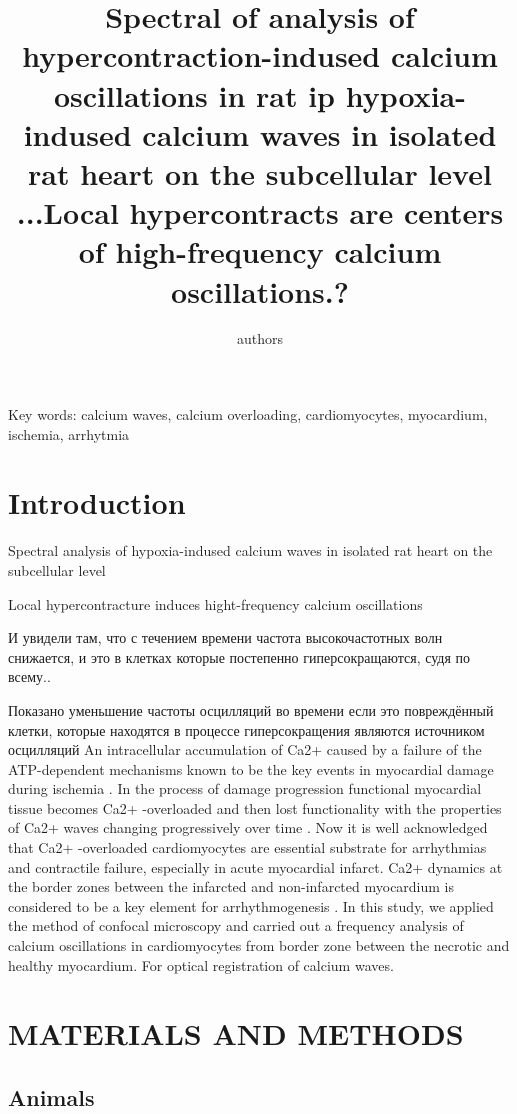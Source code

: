 \documentclass[a4paper,12pt]{article}
\title{ Spectral of analysis of hypercontraction-indused calcium oscillations in rat ip hypoxia-indused calcium waves in isolated rat heart on the subcellular level
...Local hypercontracts are centers of high-frequency calcium oscillations.?}
\author{authors}
\begin{document}
\maketitle

Key words: calcium waves, calcium overloading, cardiomyocytes, myocardium, ischemia, arrhytmia

\section{Introduction}

Spectral analysis of hypoxia-indused calcium waves in isolated rat heart on the subcellular level

Local hypercontracture induces hight-frequency calcium oscillations

И увидели там, что с течением времени частота высокочастотных волн снижается, и это в клетках которые постепенно гиперсокращаются, судя по всему..

Показано уменьшение частоты осцилляций во времени
если это повреждённый клетки, которые находятся в процессе гиперсокращения
являются источником осцилляций
An intracellular accumulation of Ca2+ caused by a failure of the ATP-dependent mechanisms known to be the key events in myocardial damage during ischemia \cite{shen1972myocardial,shen1972kinetics,nayler1981role}.
In the process of damage progression functional myocardial tissue becomes Ca2+ -overloaded and then lost functionality with the properties of Ca2+ waves changing progressively over time \cite{minamikawa1997situ,hama1998real}.
Now it is well acknowledged that Ca2+ -overloaded cardiomyocytes are essential substrate for arrhythmias and contractile failure, especially in acute myocardial infarct.
Ca2+ dynamics at the border zones between the infarcted and non-infarcted myocardium is considered to be a key element for arrhythmogenesis \cite{takamatsu2008arrhythmogenic}.
In this study, we applied the method of confocal microscopy and carried out a frequency analysis of calcium oscillations in cardiomyocytes from border zone between the necrotic and healthy myocardium.
For optical registration of calcium waves.
\cite{matsuura2018intravital}

\section{MATERIALS AND METHODS}

\subsection{Animals}
\end{document}

